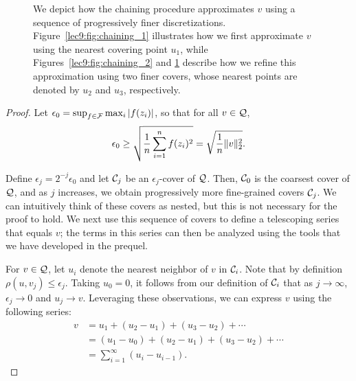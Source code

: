 \begin{figure}[ht!]
\begin{subfigure}[t]{0.45\textwidth}
        \caption{}
        \label{lec9:fig:chaining_3}
    \end{subfigure}
    \caption{We depict how the chaining procedure approximates $v$ using a sequence of progressively finer discretizations. Figure~\ref{lec9:fig:chaining_1} illustrates how we first approximate $v$ using the nearest covering point $u_1$, while Figures~\ref{lec9:fig:chaining_2} and \ref{lec9:fig:chaining_3} describe how we refine this approximation using two finer covers, whose nearest points are denoted by $u_2$ and $u_3$, respectively.}
    \label{lec9:fig:chaining_diag}
\end{figure}

\begin{proof} 
    Let $\epsilon_0 = \sup_{f\in \mathcal F} \max_i \left\lvert f(z_i)\right\rvert$, so that for all $v \in \mathcal Q$,
    \begin{equation}
        \epsilon_0 \ge \sqrt{\frac 1 n \sum_{i=1}^nf(z_i)^2}  = \sqrt{\frac 1 n \|v\|_2^2}.
    \end{equation}
    
    Define $\epsilon_j = 2^{-j}\epsilon_0$ and let $\mathcal C_j$ be an $\epsilon_j$-cover of $\mathcal Q$. Then, $\mathcal C_0$ is the coarsest cover of $\mathcal Q$, and as $j$ increases, we obtain progressively more fine-grained covers $\mathcal C_j$. We can intuitively think of these covers as nested, but this is not necessary for the proof to hold. We next use this sequence of covers to define a telescoping series that equals $v$; the terms in this series can then be analyzed using the tools that we have developed in the prequel. 
    
    For $v \in \mathcal Q$, let $u_i$ denote the nearest neighbor of $v$ in $\mathcal C_i$. Note that by definition $\rho(u, v_j) \leq \epsilon_j$. Taking $u_0 = 0$, it follows from our definition of $\mathcal C_i$ that as $j \to \infty$, $\epsilon_j \to 0$ and $u_j \to v$. Leveraging these observations, we can express $v$ using the following series:
    \begin{align}
        v &= u_1 + (u_2 - u_1) + (u_3 - u_2) + \cdots \\
        &= (u_1 - u_0) + (u_2 - u_1) + (u_3 - u_2) + \cdots \\
        &= \sum_{i = 1}^\infty (u_i - u_{i - 1}). \label{lec9:eqn:telescope_chain}
    \end{align}
    

\end{proof}
